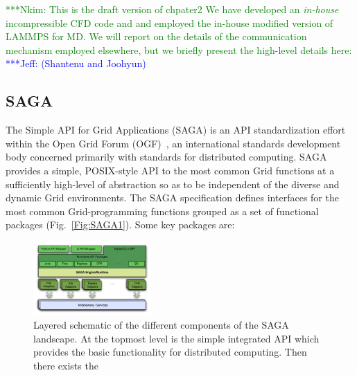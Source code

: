 \documentclass[times, 10pt,twocolumn]{article}
\newcommand{\Nkimnote}[1]{ {\textcolor{green} { ***Nkim: #1 }}}
\newcommand{\skonote}[1]{ {\textcolor{blue} { ***Jeff: #1 }}}
\newcommand{\Nkimnote}[1]{}
\newcommand{\skonote}[1]{}
\begin{document}
\Nkimnote{ This is the draft version of chpater2
We have developed an {\it in-house} incompressible CFD code and and employed the in-house modified version of LAMMPS for MD. We will report on the details of the communication mechanism employed elsewhere, but
we briefly present the high-level details here:
}
\skonote{(Shantenu and Joohyun)}

\subsection{SAGA}

The Simple API for Grid Applications (SAGA) is an API standardization effort within the Open Grid Forum (OGF)~\cite{ogf_web}, an international standards development body concerned primarily with standards for distributed computing.  SAGA provides a simple, POSIX-style API to the most common Grid functions at a sufficiently high-level of abstraction so as to be %
independent of the diverse and dynamic Grid environments. The SAGA specification defines interfaces for the most common Grid-programming functions grouped as a set of functional packages (Fig.~\ref{Fig:SAGA1}).  Some key packages are:

\begin{figure}[!ht]
  \begin{center}
      \includegraphics[width=0.40\textwidth]{stci_saga_figures-1.pdf}
  \end{center}
 \caption{\small Layered schematic of the different components
   of the SAGA landscape. At the topmost level is the simple integrated API which provides the basic functionality for distributed computing. Then there exists the} \label{sagalayer}
\end{figure}
\end{document}
